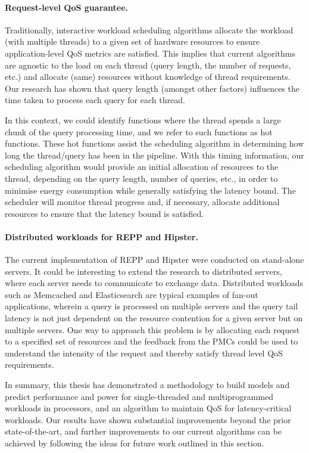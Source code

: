 \fi



 \paragraph{Request-level QoS guarantee.} Traditionally, interactive workload
scheduling algorithms allocate the workload (with multiple threads) to a given set of
hardware resources to ensure application-level QoS metrics are satisfied. This implies
that current algorithms are agnostic to the load on each thread (query length, the number
of requests, etc.) and allocate (same) resources without knowledge of thread requirements.
Our research has shown that query length (amongst other factors) influences the time taken
to process each query for each thread.

 In this context, we could identify functions where the thread spends a large
chunk of the query processing time, and we refer to such functions as hot functions.
These hot functions assist the scheduling algorithm in determining how long the
thread/query has been in the pipeline. With this timing information, our scheduling
algorithm would provide an initial allocation of resources to the thread, depending on the
query length, number of queries, etc., in order to minimise energy consumption while
generally satisfying the latency bound. The scheduler will monitor thread progress and, if
necessary, allocate additional resources to ensure that the latency bound is satisfied.


 \paragraph{Distributed workloads for REPP and Hipster.} The current
implementation of REPP and Hipster were conducted on stand-alone servers. It could be
interesting to extend the research to distributed servers, where each server needs to
communicate to exchange data. Distributed workloads such as Memcached and Elasticsearch
are typical examples of fan-out applications, wherein a query is processed on multiple
servers and the query tail latency is not just dependent on the resource contention for a
given server but on multiple servers. One way to approach this problem is by
allocating each request to a specified set of resources and the feedback from the PMCs could be used to
    understand the intensity of the request and thereby satisfy thread level QoS requirements. 


\vspace{0.2cm}

 In summary, this thesis has demonstrated a methodology to build models and
predict performance and power for single-threaded and multiprogrammed workloads in \muc
processors, and an algorithm to maintain QoS for latency-critical workloads.  Our results
have shown substantial improvements beyond the prior state-of-the-art, and further
improvements to our current algorithms can be achieved by following the ideas for future
work outlined in this section.
